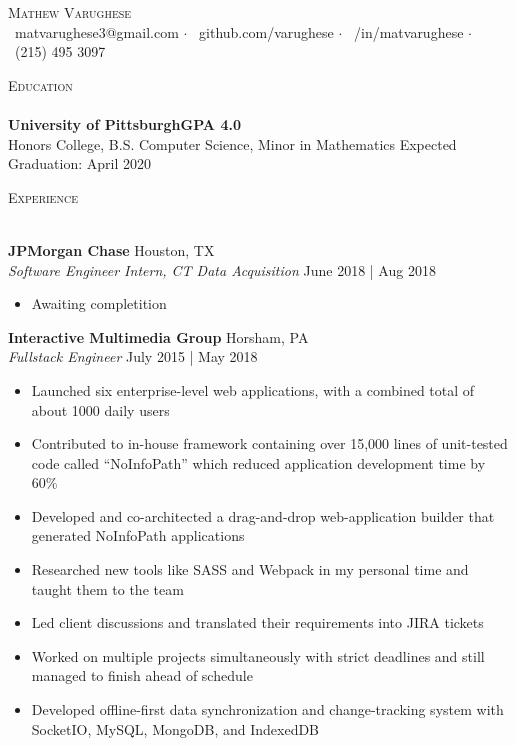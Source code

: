 \documentclass[a4paper]{article}
\newcommand{\lineunder} {
    \vspace*{-8pt} \\
    \hspace*{-18pt} \hrulefill \\
}
\newcommand{\header} [1] {
    {\hspace*{-18pt}\vspace*{6pt} \textsc{#1}}
    \vspace*{-6pt} \lineunder
}
\begin{document}
\vspace*{-40pt}

    

\vspace*{-10pt}
\begin{center}
	{\Huge \scshape {Mathew Varughese}}\\
	\faEnvelope \ matvarughese3@gmail.com $\cdot$ \faGithub \ github.com/varughese $\cdot$ \faLinkedin \ /in/matvarughese $\cdot$ \faPhone \ (215) 495 3097 \\
\end{center}

\header{Education}
\textbf{University of Pittsburgh}\hfill \textbf{GPA 4.0} \\
Honors College, B.S. Computer Science, Minor in Mathematics \hfill  Expected Graduation: April 2020\\
\vspace{2mm}

\header{Experience}
\vspace{1mm}

\textbf{JPMorgan Chase} \hfill Houston, TX\\
\textit{Software Engineer Intern, CT Data Acquisition} \hfill June 2018 | Aug 2018\\
\vspace{-1mm}
\begin{itemize} \itemsep 1pt
	\item Awaiting completition
\end{itemize}
\textbf{Interactive Multimedia Group} \hfill Horsham, PA\\
\textit{Fullstack Engineer} \hfill July 2015 | May 2018\\
\vspace{-1mm}
\begin{itemize} \itemsep 1pt
	\item Launched six enterprise-level web applications, with a combined total of about 1000 daily users
	\item Contributed to in-house framework containing over 15,000 lines of unit-tested code called “NoInfoPath” which reduced application development time by 60\%
	\item Developed and co-architected a drag-and-drop web-application builder that generated NoInfoPath applications
	\item Researched new tools like SASS and Webpack in my personal time and taught them to the team
	\item Led client discussions and translated their requirements into JIRA tickets
	\item Worked on multiple projects simultaneously with strict deadlines and still managed to finish ahead of schedule
	\item Developed offline-first data synchronization and change-tracking system with SocketIO, MySQL, MongoDB, and IndexedDB
\end{itemize}
\end{document}
